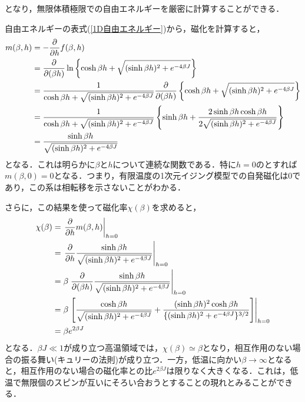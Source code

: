 \documentclass[a4paper,11pt]{jsreport}
\begin{document}
となり，無限体積極限での自由エネルギーを厳密に計算することができる．\par
自由エネルギーの表式(\ref{1D自由エネルギー})から，磁化を計算すると，
\begin{align}
  m(\beta, h)
   & = -\frac{\partial}{\partial h} f(\beta, h) \notag                                                                                                                                                   \\
   & = \frac{\partial}{\partial (\beta h)} \ln{\left\{ \cosh{\beta h} + \sqrt{(\sinh{\beta h})^2 + e^{-4\beta J}} \right\}} \notag                                                                       \\
   & = \frac{1}{\cosh{\beta h} + \sqrt{(\sinh{\beta h})^2 + e^{-4\beta J}}} \frac{\partial}{\partial (\beta h)}\left\{ \cosh{\beta h} + \sqrt{(\sinh{\beta h})^2 + e^{-4\beta J}} \right\} \notag        \\
   & =  \frac{1}{\cosh{\beta h} + \sqrt{(\sinh{\beta h})^2 + e^{-4\beta J}}} \left\{ \sinh{\beta h} + \frac{2\sinh{\beta h} \cosh{\beta h}}{2 \sqrt{(\sinh{\beta h})^2 + e^{-4\beta J}}} \right\} \notag \\
   & = \frac{\sinh{\beta h}}{\sqrt{(\sinh{\beta h})^2 + e^{-4\beta J}}}
\end{align}
となる．これは明らかに$\beta$と$h$について連続な関数である．特に$h=0$のとすれば$m(\beta, 0) = 0$となる．つまり，有限温度の1次元イジング模型での自発磁化は$0$であり，この系は相転移を示さないことがわかる．\par
さらに，この結果を使って磁化率$\chi(\beta)$を求めると，
\begin{align}
  \chi(\beta)
   & = \left.\frac{\partial}{\partial h} m(\beta, h)\right|_{h=0} \notag                                                                                                                                       \\
   & = \left.\frac{\partial}{\partial h} \frac{\sinh{\beta h}}{\sqrt{(\sinh{\beta h})^2 + e^{-4\beta J}}}\right|_{h=0} \notag                                                                                  \\
   & = \beta \left.\frac{\partial}{\partial (\beta h)} \frac{\sinh{\beta h}}{\sqrt{(\sinh{\beta h})^2 + e^{-4\beta J}}}\right|_{h=0} \notag                                                                    \\
   & = \beta \left.\left[ \frac{\cosh{\beta h}}{\sqrt{(\sinh{\beta h})^2 + e^{-4\beta J}}} +\frac{(\sinh{\beta h})^2 \cosh{\beta h}}{\{(\sinh{\beta h})^2 + e^{-4\beta J}\}^{3/2}} \right]\right|_{h=0} \notag \\
   & = \beta e^{2\beta J}
\end{align}
となる．$\beta J \ll 1$が成り立つ高温領域では，$\chi(\beta) \simeq \beta$となり，相互作用のない場合の振る舞い(キュリーの法則)が成り立つ．一方，低温に向かい$\beta \rightarrow \infty$となると，相互作用のない場合の磁化率との比$e^{2\beta J}$は限りなく大きくなる．これは，低温で無限個のスピンが互いにそろい合おうとすることの現れとみることができる．\par
\end{document}
